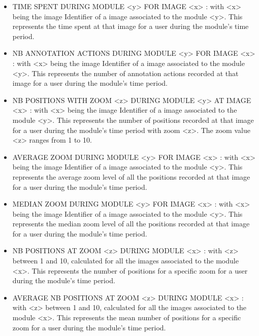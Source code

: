 \documentclass[a4paper,11pt]{report}
\numberwithin{figure}{section} %
\begin{document}
\begin{itemize}
    \item[\textbullet] TIME SPENT DURING MODULE <y> FOR IMAGE <x> : with <x> being the image Identifier of a image associated to the module <y>. This represents the time spent at that image for a user during the module's time period. \\         
    
    \item[\textbullet] NB ANNOTATION ACTIONS DURING MODULE <y> FOR IMAGE <x> : with <x> being the image Identifier of a image associated to the module <y>. This represents the number of annotation actions recorded at that image for a user during the module's time period. \\ 
     
     
     \item[\textbullet] NB POSITIONS WITH ZOOM <z> DURING MODULE <y> AT IMAGE <x> : with <x> being the image Identifier of a image associated to the module <y>. This represents the number of positions recorded at that image for a user during the module's time period with zoom <z>. The zoom value <z> ranges from 1 to 10. \\ 
     
     \item[\textbullet] AVERAGE ZOOM DURING MODULE <y> FOR IMAGE <x> : with <x> being the image Identifier of a image associated to the module <y>. This represents the average zoom level of all the positions recorded at that image for a user during the module's time period. \\ 
     
     \item[\textbullet] MEDIAN ZOOM DURING MODULE <y> FOR IMAGE <x> : with <x> being the image Identifier of a image associated to the module <y>. This represents the median zoom level of all the positions recorded at that image for a user during the module's time period. \\ 
     
     \item[\textbullet] NB POSITIONS AT ZOOM <z> DURING MODULE <x> : with <z> between 1 and 10, calculated for all the images associated to the module <x>. This represents the number of positions for a specific zoom for a user during the module's time period. \\ 
     
	\item[\textbullet] AVERAGE NB POSITIONS AT ZOOM <z> DURING MODULE <x> : with <z> between 1 and 10, calculated for all the images associated to the module <x>. This represents the mean number of positions for a specific zoom for a user during the module's time period. \\ 


\end{itemize}
\end{document}
